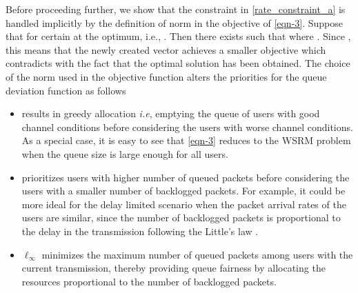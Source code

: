 Before proceeding further, we show that the constraint in \eqref{rate_constraint_a} is handled implicitly by the definition of norm  in the objective of \eqref{eqn-3}. Suppose that  for certain  at the optimum, i.e., . Then there exists  such that  where . Since , this means that the newly created vector  achieves a smaller objective which contradicts with the fact that the optimal solution has been obtained. The choice of the norm  used in the objective function \cite{berry2004cross,qps_cioffi} alters the priorities for the queue deviation function as follows
\begin{itemize}
\item {} results in greedy allocation \textit{i.e}, emptying the queue of users with good channel conditions before considering the users with worse channel conditions. As a special case, it is easy to see that \eqref{eqn-3} reduces to the \ac{WSRM} problem when the queue size is large enough for all users.
\item {} prioritizes users with higher number of queued packets before considering the users with a smaller number of backlogged packets. For example, it could be more ideal for the delay limited scenario when the packet arrival rates of the users are similar, since the number of backlogged packets is proportional to the delay in the transmission following the Little's law \cite{neely2010stochastic}.
\item \(\ell_{\infty} \) minimizes the maximum number of queued packets among users with the current transmission, thereby providing queue fairness by allocating the resources proportional to the number of backlogged packets.
\end{itemize} 
